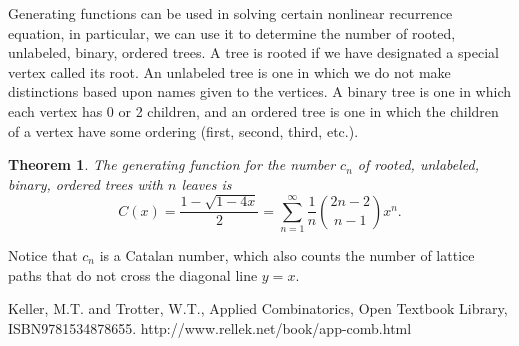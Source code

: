 \documentclass{article}
\newtheorem{theorem}{Theorem}[section]
\begin{document}
Generating functions can be used in solving certain nonlinear recurrence equation, in particular, we can use it to determine the number of rooted, unlabeled, binary, ordered trees.  A tree is rooted if we have designated a special vertex called its root. An unlabeled tree is one in which we do not make distinctions based upon names given to the vertices. A binary tree is one in which each vertex has 0 or 2 children, and an ordered tree is one in which the children of a vertex have some ordering (first, second, third, etc.).

\begin{theorem}
The generating function for the number $c_n$  of rooted, unlabeled, binary, ordered trees with $n$ leaves is
\[
C(x) = \frac{1-\sqrt{1-4x}}{2} = \sum_{n=1}^\infty \frac{1}{n}\binom{2n-2}{n-1}x^n.
\]
\end{theorem}
Notice that $c_n$ is a Catalan number, which also counts the number of lattice paths that do not cross the diagonal line $y=x$.

\begin{thebibliography}{}
\bibitem{}
Keller, M.T. and Trotter, W.T., Applied Combinatorics, Open Textbook Library, ISBN9781534878655. http://www.rellek.net/book/app-comb.html

\end{thebibliography}
\end{document}
